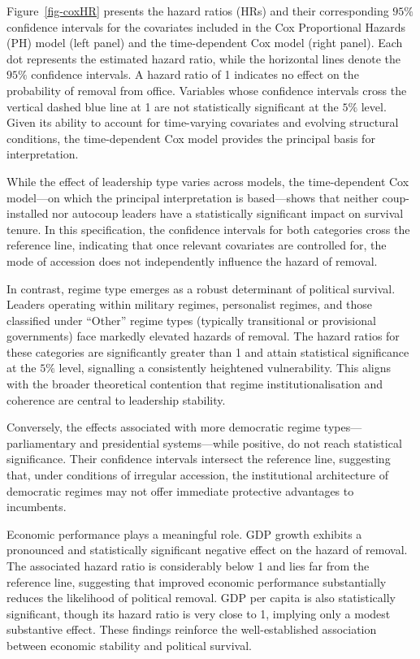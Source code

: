 \documentclass[
  12pt,
]{report}
\begin{document}
Figure~\ref{fig-coxHR} presents the hazard ratios (HRs) and their
corresponding \(95\%\) confidence intervals for the covariates included
in the Cox Proportional Hazards (PH) model (left panel) and the
time-dependent Cox model (right panel). Each dot represents the
estimated hazard ratio, while the horizontal lines denote the \(95\%\)
confidence intervals. A hazard ratio of 1 indicates no effect on the
probability of removal from office. Variables whose confidence intervals
cross the vertical dashed blue line at 1 are not statistically
significant at the \(5\%\) level. Given its ability to account for
time-varying covariates and evolving structural conditions, the
time-dependent Cox model provides the principal basis for
interpretation.

While the effect of leadership type varies across models, the
time-dependent Cox model---on which the principal interpretation is
based---shows that neither coup-installed nor autocoup leaders have a
statistically significant impact on survival tenure. In this
specification, the confidence intervals for both categories cross the
reference line, indicating that once relevant covariates are controlled
for, the mode of accession does not independently influence the hazard
of removal.

In contrast, regime type emerges as a robust determinant of political
survival. Leaders operating within military regimes, personalist
regimes, and those classified under ``Other'' regime types (typically
transitional or provisional governments) face markedly elevated hazards
of removal. The hazard ratios for these categories are significantly
greater than 1 and attain statistical significance at the \(5\%\) level,
signalling a consistently heightened vulnerability. This aligns with the
broader theoretical contention that regime institutionalisation and
coherence are central to leadership stability.

Conversely, the effects associated with more democratic regime
types---parliamentary and presidential systems---while positive, do not
reach statistical significance. Their confidence intervals intersect the
reference line, suggesting that, under conditions of irregular
accession, the institutional architecture of democratic regimes may not
offer immediate protective advantages to incumbents.

Economic performance plays a meaningful role. GDP growth exhibits a
pronounced and statistically significant negative effect on the hazard
of removal. The associated hazard ratio is considerably below 1 and lies
far from the reference line, suggesting that improved economic
performance substantially reduces the likelihood of political removal.
GDP per capita is also statistically significant, though its hazard
ratio is very close to 1, implying only a modest substantive effect.
These findings reinforce the well-established association between
economic stability and political survival.
\end{document}
